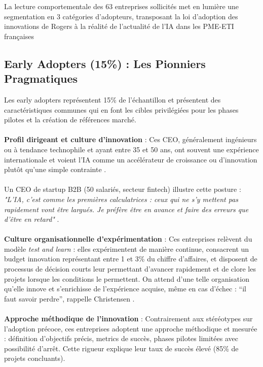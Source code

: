 La lecture comportementale des 63 entreprises sollicités met en lumière une segmentation en 3 catégories d'adopteurs, transposant la loi d'adoption des innovations de Rogers à la réalité de l'actualité de l'IA dans les PME-ETI françaises

\subsection{Early Adopters (15\%) : Les Pionniers Pragmatiques}

Les early adopters représentent 15\% de l'échantillon et présentent des caractéristiques communes qui en font les cibles privilégiées pour les phases pilotes et la création de références marché.
\\\\
\textbf{Profil dirigeant et culture d'innovation} : Ces CEO, généralement ingénieurs ou à tendance technophile et ayant entre 35 et 50 ans, ont souvent une expérience internationale et voient l’IA comme un accélérateur de croissance ou d’innovation plutôt qu’une simple contrainte \cite{luwai2025meetings}.
\\\\
Un CEO de startup B2B (50 salariés, secteur fintech) illustre cette posture : \emph{"L'IA, c'est comme les premières calculatrices : ceux qui ne s'y mettent pas rapidement vont être largués. Je préfère être en avance et faire des erreurs que d'être en retard"} \cite{luwai2025meetings}.
\\\\
\textbf{Culture organisationnelle d'expérimentation} : Ces entreprises relèvent du modèle \emph{test and learn} : elles expérimentent de manière continue, consacrent un budget innovation représentant entre 1 et 3\% du chiffre d'affaires, et disposent de processus de décision courts leur permettant d'avancer rapidement et de clore les projets lorsque les conditions le permettent. On attend d'une telle organisation qu'elle innove et s'enrichisse de l'expérience acquise, même en cas d'échec : \enquote{il faut savoir perdre}, rappelle Christensen \cite{christensen1997innovator}.
\\\\
\textbf{Approche méthodique de l'innovation} : Contrairement aux stéréotypes sur l'adoption précoce, ces entreprises adoptent une approche méthodique et mesurée : définition d'objectifs précis, metrics de succès, phases pilotes limitées avec possibilité d'arrêt. Cette rigueur explique leur taux de succès élevé (85\% de projets concluants).

